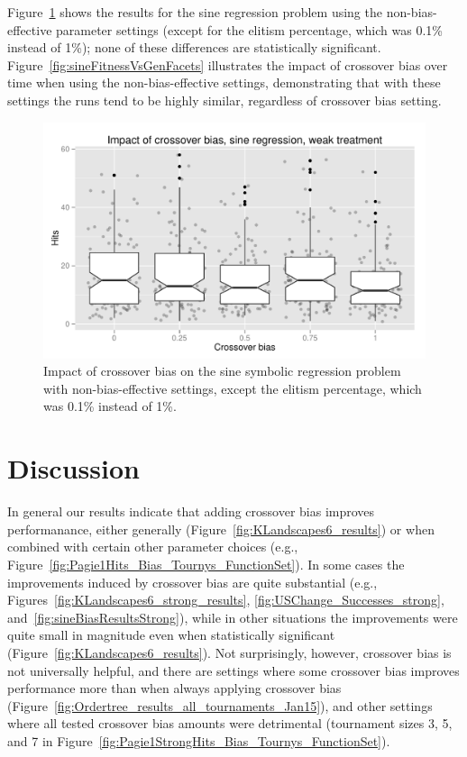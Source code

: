 \documentclass{sig-alternate}
\begin{document}
Figure~\ref{fig:sineBiasResultsWeak} shows the results for the sine regression problem using the non-bias-effective
parameter settings (except for the elitism percentage, which was 0.1\% instead of 1\%); 
none of these differences are statistically significant. Figure~\ref{fig:sineFitnessVsGenFacets}
illustrates the impact of crossover bias over time when using the non-bias-effective settings, demonstrating that 
with these settings 
the runs tend to be highly similar, 
regardless of crossover bias setting. 


\begin{figure}
\centering
\includegraphics[width=0.45 \textwidth]{Plots/Sine_XO_impact_weak_boxplot.pdf}
\caption{Impact of crossover bias on the sine symbolic regression problem with non-bias-effective settings, 
	except the elitism percentage, which was 0.1\% instead of 1\%.}
\label{fig:sineBiasResultsWeak}
\end{figure}

\section{Discussion} \label{sec:Discussion}

In general our results indicate that adding crossover bias improves performanance, either generally
(Figure~\ref{fig:KLandscapes6_results}) or when combined with certain other parameter choices (e.g.,
Figure~\ref{fig:Pagie1Hits_Bias_Tournys_FunctionSet}). In some cases the improvements induced by crossover bias are
quite substantial (e.g., Figures~\ref{fig:KLandscapes6_strong_results}, \ref{fig:USChange_Successes_strong},
and~\ref{fig:sineBiasResultsStrong}), while in other situations the improvements were quite small in magnitude even
when statistically significant (Figure~\ref{fig:KLandscapes6_results}). Not surprisingly, however, crossover bias is
not universally helpful, and there are settings where some crossover bias improves performance more than when always
applying crossover bias (Figure~\ref{fig:Ordertree_results_all_tournaments_Jan15}), and other settings where all tested
crossover bias amounts were detrimental (tournament sizes 3, 5, and 7 in
Figure~\ref{fig:Pagie1StrongHits_Bias_Tournys_FunctionSet}).
\end{document}
